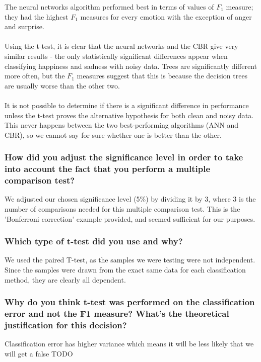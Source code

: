 \documentclass[12pt]{article}
\begin{document}
The neural networks algorithm performed best in terms of values of $F_1$ measure; they had the highest $F_1$ measures for every emotion with the exception of anger and surprise. \\ \\
Using the t-test, it is clear that the neural networks and the CBR give very similar results - the only statistically significant differences appear when classifying happiness and sadness with noisy data. Trees are significantly different more often, but the $F_1$ measures suggest that this is because the decision trees are usually worse than the other two. \\ \\
It is not possible to determine if there is a significant difference in performance unless the t-test proves the alternative hypothesis for both clean and noisy data. This never happens between the two best-performing algorithms (ANN and CBR), so we cannot say for sure whether one is better than the other.

\subsubsection*{How did you adjust the significance level in order to take into account the fact that you perform a multiple comparison test?}

We adjusted our chosen significance level (5\%) by dividing it by 3, where 3 is the number of comparisons needed for this multiple comparison test. This is the 'Bonferroni correction' example provided, and seemed sufficient for our purposes.

\subsubsection*{Which type of t-test did you use and why?}

We used the paired T-test, as the samples we were testing were not independent. Since the samples were drawn from the exact same data for each classification method, they are clearly all dependent.

\subsubsection*{Why do you think t-test was performed on the classification error and not the F1 measure? What's the theoretical justification for this decision?}

Classification error has higher variance which means it will be less likely that we will get a false TODO
\end{document}
